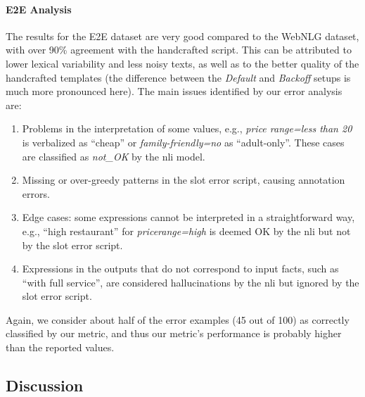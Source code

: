 \paragraph{E2E Analysis} The results for the E2E dataset are very good compared to the WebNLG dataset, with over 90\% agreement with the handcrafted script. This can be attributed to lower lexical variability and less noisy texts, as well as to the better quality of the handcrafted templates (the difference between the \emph{Default} and \emph{Backoff} setups is much more pronounced here). The main issues identified by our error analysis are:
\begin{enumerate}
    \item Problems in the interpretation of some values, e.g., \textit{price range=less than \textsterling{}20} is verbalized as ``cheap'' or \textit{family-friendly=no} as ``adult-only''. These cases are classified as \emph{not\_OK} by the \ac{nli} model.
    \item Missing or over-greedy patterns in the slot error script, causing annotation errors.
    \item Edge cases: some expressions cannot be interpreted in a straightforward way, e.g., ``high restaurant'' for \emph{pricerange=high} is deemed OK by the \ac{nli} but not by the slot error script.
    \item Expressions in the outputs that do not correspond to input facts, such as ``with full service'', are considered hallucinations by the \ac{nli} but ignored by the slot error script.
\end{enumerate}
Again, we consider about half of the error examples (45 out of 100) as correctly classified by our metric, and thus our metric's performance is probably higher than the reported values.

\subsection{Discussion}


